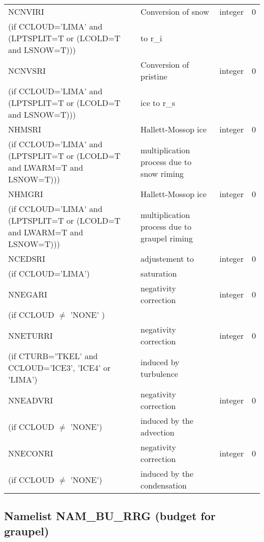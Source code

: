 \begin{longtable} {|p{}|p{}|>{\centering}p{}|p{}<{\centering}|}
NCNVIRI & Conversion of snow     & integer  &  0 \index{NCNVIRI!\innam{NAM\_BU\_RRI}}\\ \nopagebreak
(if CCLOUD='LIMA' and (LPTSPLIT=T or (LCOLD=T and LSNOW=T))) &to r\_i &   &  \\\hline
NCNVSRI &  Conversion of pristine    & integer  &  0 \index{NCNVSRI!\innam{NAM\_BU\_RRI}}\\ \nopagebreak
(if CCLOUD='LIMA' and (LPTSPLIT=T or (LCOLD=T and LSNOW=T))) &ice to r\_s &   &  \\\hline
NHMSRI &Hallett-Mossop ice & integer  &  0 \index{NHMSRI!\innam{NAM\_BU\_RRI}}\\ \nopagebreak
(if CCLOUD='LIMA' and (LPTSPLIT=T or (LCOLD=T and LWARM=T and LSNOW=T))) &multiplication process due to snow riming &   &  \\\hline
NHMGRI &  Hallett-Mossop ice & integer  &  0 \index{NHMGRI!\innam{NAM\_BU\_RRI}}\\ \nopagebreak
(if CCLOUD='LIMA' and (LPTSPLIT=T or (LCOLD=T and LWARM=T and LSNOW=T))) &multiplication process due to graupel riming &   &  \\\hline
NCEDSRI & adjustement to   & integer  &  0 \index{NCEDSRI!\innam{NAM\_BU\_RRI}}\\ \nopagebreak
(if CCLOUD='LIMA') & saturation &   &  \\\hline
NNEGARI   & negativity correction & integer  &  0 \index{NNEGARI!\innam{NAM\_BU\_RRI}}\\ \nopagebreak
(if CCLOUD $\neq$ 'NONE' )& &   &  \\\hline
NNETURRI  &negativity correction   & integer  &  0 \index{NNETURRI!\innam{NAM\_BU\_RRI}}\\ \nopagebreak
(if CTURB='TKEL' and CCLOUD='ICE3', 'ICE4' or 'LIMA')   &induced by turbulence   &       &   \\\hline
NNEADVRI  & negativity correction  & integer  &  0 \index{NNEADVRI!\innam{NAM\_BU\_RRI}}\\ \nopagebreak
(if CCLOUD $\neq$ 'NONE') & induced by the advection&   &  \\\hline
NNECONRI  &negativity correction    & integer  &  0 \index{NNECONRI!\innam{NAM\_BU\_RRI}}\\ \nopagebreak
(if CCLOUD $\neq$ 'NONE') &induced by the condensation &   &  \\\hline
\end{longtable}

\subsection{Namelist NAM\_BU\_RRG (budget for graupel)}

